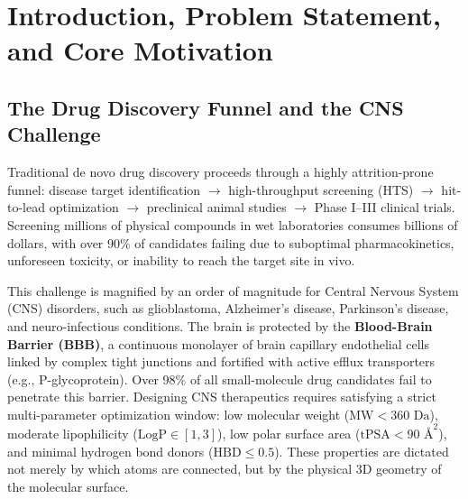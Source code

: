 \documentclass[12pt, a4paper]{article}
\begin{document}
\begin{abstract}
Crucially, this report provides a transparent, exhaustive scientific autopsy of the BBB generation campaign. When applying continuous coordinate diffusion to the larger, more flexible BBBP dataset, the model produced multi-fragment ``atom soup'' (BondsPerMol $\approx 32.5$, ConnectedValidity $\approx 2.2\%$). Rather than obfuscating this challenge, we systematically tested and excluded five independent structural hypotheses: training step budget, post-hoc force-field relaxation, valence demand dilution, rotation-invariant Kabsch supervision, and bond-order perception thresholds. We detail our complete 11-arm sampler operating matrix, the mathematical derivation of the exact zero-velocity analytic flow baseline ($E\|\epsilon_c - x_0\|^2 \approx 3.90$), and our newly deployed 7-stage biochemical Lab-Readiness Gate. We provide complete reproducibility data, figures, and an actionable roadmap toward production molecular design.
\end{abstract}

\vspace{0.5em}
\tableofcontents
\newpage

\section{Introduction, Problem Statement, and Core Motivation}

\subsection{The Drug Discovery Funnel and the CNS Challenge}
Traditional de novo drug discovery proceeds through a highly attrition-prone funnel: disease target identification $\to$ high-throughput screening (HTS) $\to$ hit-to-lead optimization $\to$ preclinical animal studies $\to$ Phase I--III clinical trials. Screening millions of physical compounds in wet laboratories consumes billions of dollars, with over 90\% of candidates failing due to suboptimal pharmacokinetics, unforeseen toxicity, or inability to reach the target site in vivo.

This challenge is magnified by an order of magnitude for Central Nervous System (CNS) disorders, such as glioblastoma, Alzheimer's disease, Parkinson's disease, and neuro-infectious conditions. The brain is protected by the \textbf{Blood-Brain Barrier (BBB)}, a continuous monolayer of brain capillary endothelial cells linked by complex tight junctions and fortified with active efflux transporters (e.g., P-glycoprotein). Over 98\% of all small-molecule drug candidates fail to penetrate this barrier. Designing CNS therapeutics requires satisfying a strict multi-parameter optimization window: low molecular weight ($\text{MW} < 360\text{ Da}$), moderate lipophilicity ($\text{LogP} \in [1, 3]$), low polar surface area ($\text{tPSA} < 90\text{ \AA}^2$), and minimal hydrogen bond donors ($\text{HBD} \leq 0.5$). These properties are dictated not merely by which atoms are connected, but by the physical 3D geometry of the molecular surface.
\end{document}
